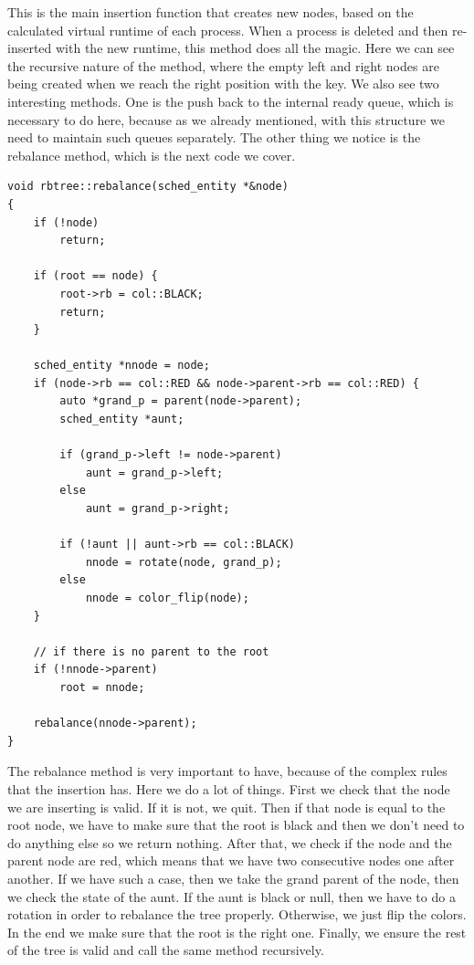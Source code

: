 \documentclass{article}
\begin{document}
This is the main insertion function that creates new nodes, based on the calculated virtual runtime of each process. When a process is deleted and then re-inserted with the new runtime, this method does all the magic. Here we can see the recursive nature of the method, where the empty left and right nodes are being created when we reach the right position with the key. We also see two interesting methods. One is the push back to the internal ready queue, which is necessary to do here, because as we already mentioned, with this structure we need to maintain such queues separately. The other thing we notice is the rebalance method, which is the next code we cover.

\begin{lstlisting}
void rbtree::rebalance(sched_entity *&node)
{
    if (!node)
        return;

    if (root == node) {
        root->rb = col::BLACK;
        return;
    }

    sched_entity *nnode = node;
    if (node->rb == col::RED && node->parent->rb == col::RED) {
        auto *grand_p = parent(node->parent);
        sched_entity *aunt;

        if (grand_p->left != node->parent)
            aunt = grand_p->left;
        else
            aunt = grand_p->right;

        if (!aunt || aunt->rb == col::BLACK)
            nnode = rotate(node, grand_p);
        else
            nnode = color_flip(node);
    }

    // if there is no parent to the root
    if (!nnode->parent)
        root = nnode;

    rebalance(nnode->parent);
}
\end{lstlisting}

The rebalance method is very important to have, because of the complex rules that the insertion has. Here we do a lot of things. First we check that the node we are inserting is valid. If it is not, we quit. Then if that node is equal to the root node, we have to make sure that the root is black and then we don't need to do anything else so we return nothing. After that, we check if the node and the parent node are red, which means that we have two consecutive nodes one after another. If we have such a case, then we take the grand parent of the node, then we check the state of the aunt. If the aunt is black or null, then we have to do a rotation in order to rebalance the tree properly. Otherwise, we just flip the colors. In the end we make sure that the root is the right one. Finally, we ensure the rest of the tree is valid and call the same method recursively.
\end{document}
